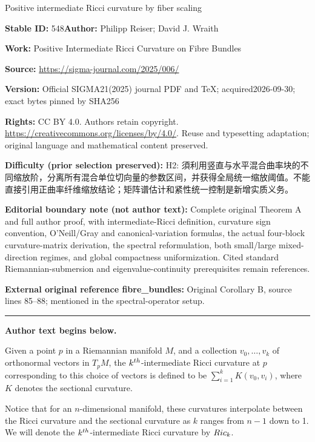 \documentclass[11pt]{article}
\numberwithin{equation}{section}
\numberwithin{equation}{section}
\begin{document}
\begin{center}\Large Positive intermediate Ricci curvature by fiber scaling\end{center}
\noindent\textbf{Stable ID:} 548\quad\textbf{Author:} Philipp Reiser; David J. Wraith\par
\noindent\textbf{Work:} Positive Intermediate Ricci Curvature on Fibre Bundles\par
\noindent\textbf{Source:} \url{https://sigma-journal.com/2025/006/}\par
\noindent\textbf{Version:} Official SIGMA21(2025) journal PDF and TeX; acquired2026-09-30; exact bytes pinned by SHA256\par
\noindent\textbf{Rights:} CC BY 4.0. Authors retain copyright. \url{https://creativecommons.org/licenses/by/4.0/}. Reuse and typesetting adaptation; original language and mathematical content preserved.\par
\noindent\textbf{Difficulty (prior selection preserved):} {\CJKfont H2: 須利用竖直与水平混合曲率块的不同缩放阶，分离所有混合单位切向量的参数区间，并获得全局统一缩放阈值。不能直接引用正曲率纤维缩放结论；矩阵谱估计和紧性统一控制是新增实质义务。}\par
\medskip\noindent\textbf{Editorial boundary note (not author text):} Complete original Theorem A and full author proof, with intermediate-Ricci definition, curvature sign convention, O’Neill/Gray and canonical-variation formulas, the actual four-block curvature-matrix derivation, the spectral reformulation, both small/large mixed-direction regimes, and global compactness uniformization. Cited standard Riemannian-submersion and eigenvalue-continuity prerequisites remain references.\par
\noindent\textbf{External original reference fibre\_bundles:} Original Corollary B, source lines 85–88; mentioned in the spectral-operator setup.\par
\medskip\hrule\medskip\noindent\textbf{Author text begins below.}\par
\setcounter{section}{1}
\begin{Definition}
	Given a point $p$ in a Riemannian manifold $M$, and a collection $v_0,\dots,v_k$ of orthonormal vectors in $T_pM$, the $k^{\rm th}$-intermediate Ricci curvature at $p$ corresponding to this choice of vectors is defined to be $\sum_{i=1}^k K(v_0,v_i)$, where $K$ denotes the sectional curvature.
\end{Definition}
Notice that for an $n$-dimensional manifold, these curvatures interpolate between the Ricci curvature and the sectional curvature as $k$ ranges from $n-1$ down to 1. We will denote the $k^{\rm th}$-intermediate Ricci curvature by ${\rm Ric}_k$.
\end{document}
